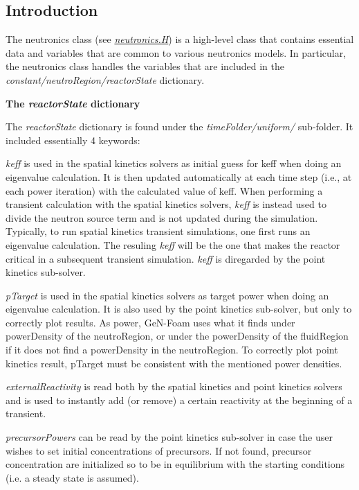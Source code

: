 \subsection*{Introduction}

The neutronics class (see {\itshape \hyperlink{neutronics_8H}{neutronics.\+H}}) is a high-\/level class that contains essential data and variables that are common to various neutronics models. In particular, the neutronics class handles the variables that are included in the {\itshape constant/neutro\+Region/reactor\+State} dictionary.

 {\bfseries The {\itshape reactor\+State} dictionary}

The {\itshape reactor\+State} dictionary is found under the {\itshape time\+Folder/uniform/} sub-\/folder. It included essentially 4 keywords\+: 
\begin{DoxyItemize}
\item {\itshape keff} is used in the spatial kinetics solvers as initial guess for keff when doing an eigenvalue calculation. It is then updated automatically at each time step (i.\+e., at each power iteration) with the calculated value of keff. When performing a transient calculation with the spatial kinetics solvers, {\itshape keff} is instead used to divide the neutron source term and is not updated during the simulation. Typically, to run spatial kinetics transient simulations, one first runs an eigenvalue calculation. The resuling {\itshape keff} will be the one that makes the reactor critical in a subsequent transient simulation. {\itshape keff} is diregarded by the point kinetics sub-\/solver. 
\item {\itshape p\+Target} is used in the spatial kinetics solvers as target power when doing an eigenvalue calculation. It is also used by the point kinetics sub-\/solver, but only to correctly plot results. As power, Ge\+N-\/\+Foam uses what it finds under power\+Density of the neutro\+Region, or under the power\+Density of the fluid\+Region if it does not find a power\+Density in the neutro\+Region. To correctly plot point kinetics result, p\+Target must be consistent with the mentioned power densities. 
\item {\itshape external\+Reactivity} is read both by the spatial kinetics and point kinetics solvers and is used to instantly add (or remove) a certain reactivity at the beginning of a transient. 
\item {\itshape precursor\+Powers} can be read by the point kinetics sub-\/solver in case the user wishes to set initial concentrations of precursors. If not found, precursor concentration are initialized so to be in equilibrium with the starting conditions (i.\+e. a steady state is assumed). 
\end{DoxyItemize}

